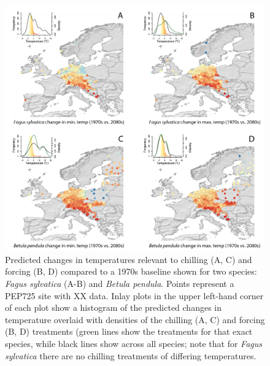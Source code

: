 \documentclass[11pt,letterpaper]{article}
\begin{document}
\begin{figure}[t!]
\centering
\includegraphics[width=1\textwidth]{figures/Fig1_noblues_densities.png}
\caption{Predicted changes in temperatures relevant to chilling (A, C) and forcing (B, D) compared to a 1970s baseline shown for two species: \emph{Fagus sylvatica} (A-B) and \emph{Betula pendula}. Points represent a PEP725 site with XX data. Inlay plots in the upper left-hand corner of each plot show a histogram of the predicted changes in temperature overlaid with densities of the chilling (A, C) and forcing (B, D) treatments (green lines show the treatments for that exact species, while black lines show across all species; note that for \emph{Fagus sylvatica} there are no chilling treatments of differing temperatures.}
  \label{fig:pep}
\end{figure}
\clearpage
\end{document}
